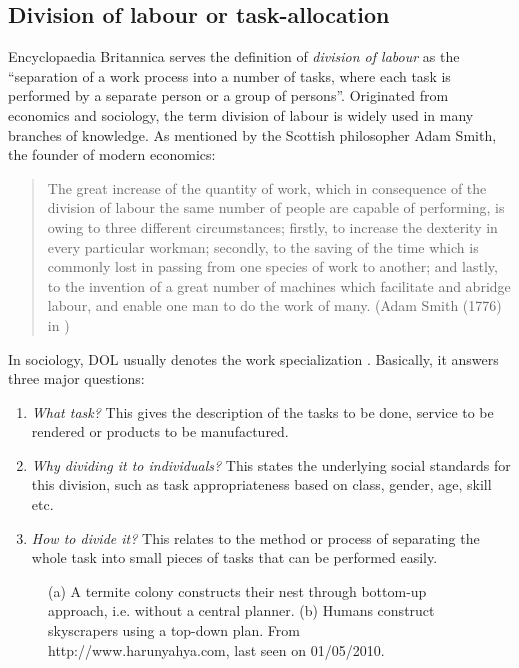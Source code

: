 \subsection{Division of labour or task-allocation}
\label{bg:def:dol}
Encyclopaedia Britannica  serves the definition of {\em division of labour} as the ``separation of a work process into a number of tasks, where each task is performed by a separate person or a group of persons''. Originated from economics and sociology, the term division of labour is widely used in many branches of knowledge. As mentioned by the Scottish philosopher Adam Smith, the founder of modern economics:
\begin{quote}
\ssp 
The great increase of the quantity of work, which in consequence of the division of labour the same number of people are capable of performing, is owing to three different circumstances; firstly, to increase the dexterity in every particular workman; secondly, to the saving of the time which is commonly lost in passing from one species of work to another; and lastly, to the invention of a great number of machines which facilitate and abridge labour, and enable one man to do the work of many.
(Adam Smith (1776) in )
\end{quote} 
\sdp
In sociology, DOL usually denotes the work specialization \cite{Sayer+1992}. Basically, it answers three major questions:
\begin{enumerate}
\item {\em What task?} This gives the description of the tasks to be done, service to be rendered or products to be manufactured.
\item {\em Why dividing it to individuals?} This states the underlying social standards for this division, such as task appropriateness based on class, gender, age, skill etc.
\item {\em How to divide it?} This relates to the method or process of separating the whole task into small pieces of tasks that can be performed easily. 
\end{enumerate}
\begin{figure}[H]
\centering
{} 
\hspace{0.25cm}
\caption{(a) A termite colony constructs their nest through bottom-up approach, i.e. without a central planner. (b) Humans construct skyscrapers using a top-down plan. From http://www.harunyahya.com, last seen on 01/05/2010.}
\label{fig:termite-nest}
\end{figure}
